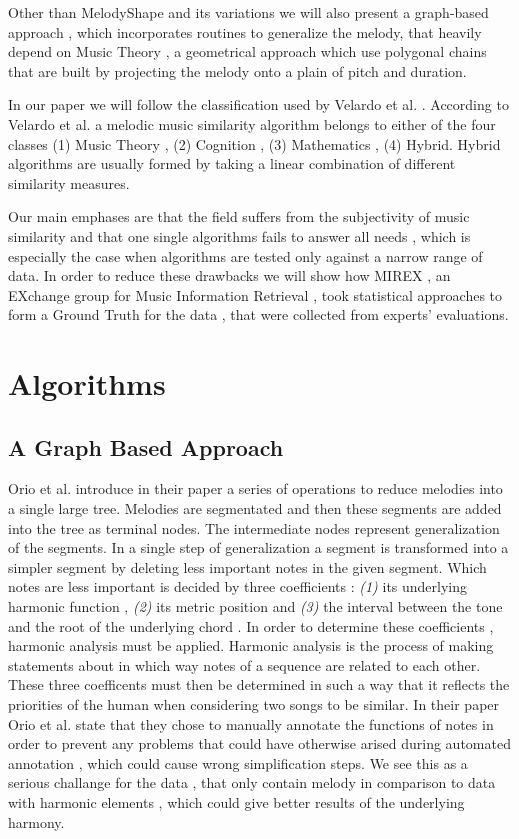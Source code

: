 \documentclass{llncs}
\begin{document}
		Other than MelodyShape and its variations we will also present a graph-based approach \cite{two_point_four} , which incorporates routines to generalize the melody, that heavily depend on Music Theory , a geometrical approach which use polygonal chains that are built by projecting the melody onto a plain of pitch and duration.

		In our paper we will follow the classification used by Velardo et al. \cite{two}. According to Velardo et al. a melodic music similarity algorithm belongs to either of the four classes (1) Music Theory , (2) Cognition , (3) Mathematics , (4) Hybrid. Hybrid algorithms are usually formed by taking a linear combination of different similarity measures. 

		Our main emphases are that the field suffers from the subjectivity of music similarity and that one single algorithms fails to answer all needs , which is especially the case when algorithms are tested only against a narrow range of data. In order to reduce these drawbacks we will show how MIREX , an EXchange group for Music Information Retrieval , took statistical approaches to form a Ground Truth for the data , that were collected from experts' evaluations. 
	
	\section{Algorithms}

		\subsection{A Graph Based Approach}

		Orio et al. \cite{two_point_four} introduce in their paper a series of operations to reduce melodies into a single large tree. Melodies are segmentated and then these segments are added into the tree as terminal nodes. The intermediate nodes represent generalization of the segments. 
		In a single step of generalization a segment is transformed into a simpler segment by deleting less important notes in the given segment. Which notes are less important is decided by three coefficients : \textit{(1)} its underlying harmonic function , \textit{(2)} its metric position  and \textit{(3)} the interval between the tone and the root of the underlying chord . 
		In order to determine these coefficients , harmonic analysis must be applied. Harmonic analysis is the process of making statements about in which way notes of a sequence are related to each other. These three coefficents must then be determined in such a way that it reflects the priorities of the human when considering two songs to be similar. 
		In their paper Orio et al. state that they chose to manually annotate the functions of notes in order to prevent any problems that could have otherwise arised during automated annotation , which could cause wrong simplification steps. We see this as a serious challange for the data , that only contain melody in comparison to data with harmonic elements , which could give better results of the underlying harmony. 
\end{document}

